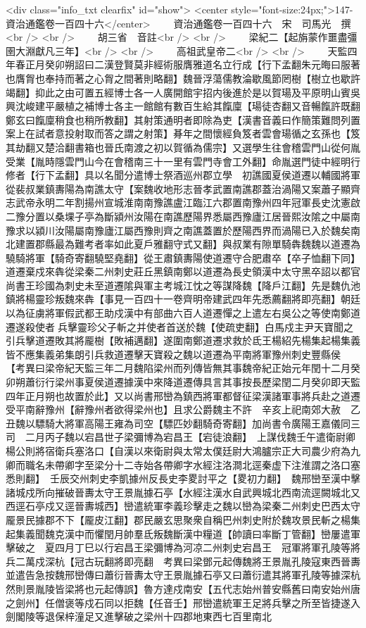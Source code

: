 <div class="info_txt clearfix" id="show">
<center style="font-size:24px;">147-資治通鑑卷一百四十六</center>
  　　資治通鑑卷一百四十六　宋　司馬光　撰<br />
<br />
　　胡三省　音註<br />
<br />
　　梁紀二【起旃蒙作噩盡彊圉大淵獻凡三年】<br />
<br />
　　高祖武皇帝二<br />
<br />
　　天監四年春正月癸卯朔詔曰二漢登賢莫非經術服膺雅道名立行成【行下孟翻朱元晦曰服著也膺胷也奉持而著之心胷之間著則略翻】魏晉浮蕩儒教淪歇風節罔樹【樹立也歇許竭翻】抑此之由可置五經博士各一人廣開館宇招内後進於是以賀瑒及平原明山賓吳興沈峻建平嚴植之補博士各主一館館有數百生給其餼廩【瑒徒杏翻又音暢餼許既翻鄭玄曰餼廩稍食也稍所教翻】其射策通明者即除為吏【漢書音義曰作簡策難問列置案上在試者意投射取而答之謂之射策】朞年之間懷經負笈者雲會瑒循之玄孫也【笈其劫翻又楚洽翻書箱也晉氏南渡之初以賀循為儒宗】又選學生往會稽雲門山從何胤受業【胤時隱雲門山今在會稽南三十一里有雲門寺會工外翻】命胤選門徒中經明行修者【行下孟翻】具以名聞分遣博士祭酒巡州郡立學　初譙國夏侯道遷以輔國將軍從裴叔業鎮夀陽為南譙太守【案魏收地形志晉孝武置南譙郡蓋治渦陽又案蕭子顯齊志武帝永明二年割揚州宣城淮南南豫譙盧江臨江六郡置南豫州四年冠軍長史沈憲啟二豫分置以桑堁子亭為斷潁州汝陽在南譙歷陽界悉屬西豫廬江居晉熙汝隂之中屬南豫求以潁川汝陽屬南豫廬江屬西豫則齊之南譙蓋置於歷陽西界而渦陽已入於魏矣南北建置郡縣最為難考者率如此夏戶雅翻守式又翻】與叔業有隙單騎犇魏魏以道遷為驍騎將軍【騎奇寄翻驍堅堯翻】從王肅鎮夀陽使道遷守合肥肅卒【卒子恤翻下同】道遷棄戍來犇從梁秦二州刺史莊丘黑鎮南鄭以道遷為長史領漢中太守黑卒詔以都官尚書王珍國為刺史未至道遷隂與軍主考城江忱之等謀降魏【降戶江翻】先是魏仇池鎮將楊靈珍叛魏來犇【事見一百四十一卷齊明帝建武四年先悉薦翻將即亮翻】朝廷以為征虜將軍假武都王助戍漢中有部曲六百人道遷憚之上遣左右吳公之等使南鄭道遷遂殺使者兵擊靈珍父子斬之并使者首送於魏【使疏吏翻】白馬戍主尹天寶聞之引兵擊道遷敗其將龎樹【敗補邁翻】遂圍南鄭道遷求救於氐王楊紹先楊集起楊集義皆不應集義弟集朗引兵救道遷擊天寶殺之魏以道遷為平南將軍豫州刺史豐縣侯　【考異曰梁帝紀天監三年二月魏陷梁州而列傳皆無其事魏帝紀正始元年閏十二月癸卯朔蕭衍行梁州事夏侯道遷據漢中來降道遷傳具言其事按長歷梁閏二月癸卯即天監四年正月朔也故置於此】又以尚書邢巒為鎮西將軍都督征梁漢諸軍事將兵赴之道遷受平南辭豫州【辭豫州者欲得梁州也】且求公爵魏主不許　辛亥上祀南郊大赦　乙丑魏以驃騎大將軍高陽王雍為司空【驃匹妙翻騎奇寄翻】加尚書令廣陽王嘉儀同三司　二月丙子魏以宕昌世子梁彌博為宕昌王【宕徒浪翻】　上謀伐魏壬午遣衛尉卿楊公則將宿衛兵塞洛口【自漢以來衛尉與太常太僕廷尉大鴻臚宗正大司農少府為九卿而職名未帶卿字至梁分十二寺始各帶卿字水經注洛澗北逕秦虚下注淮謂之洛口塞悉則翻】　壬辰交州刺史李凱據州反長史李畟討平之【畟初力翻】　魏邢巒至漢中擊諸城戍所向摧破晉夀太守王景胤據石亭【水經注漢水自武興城北西南流逕闕城北又西逕石亭戍又逕晉夀城西】巒遣統軍李義珍擊走之魏以巒為梁秦二州刺史巴西太守龎景民據郡不下【龎皮江翻】郡民嚴玄思聚衆自稱巴州刺史附於魏攻景民斬之楊集起集義聞魏克漢中而懼閏月帥羣氐叛魏斷漢中糧道【帥讀曰率斷丁管翻】巒屢遣軍擊破之　夏四月丁巳以行宕昌王梁彌博為河凉二州刺史宕昌王　冠軍將軍孔陵等將兵二萬戍深杭【冠古玩翻將即亮翻　考異曰梁鄧元起傳魏將王景胤孔陵寇東西晉夀並遣告急按魏邢巒傳曰蕭衍晉夀太守王景胤據石亭又曰蕭衍遣其將軍孔陵等據深杭然則景胤陵皆梁將也元起傳誤】魯方達戍南安【五代志始州普安縣舊曰南安始州唐之劍州】任僧褒等戍石同以拒魏【任音壬】邢巒遣統軍王足將兵擊之所至皆捷遂入劍閣陵等退保梓潼足又進擊破之梁州十四郡地東西七百里南北